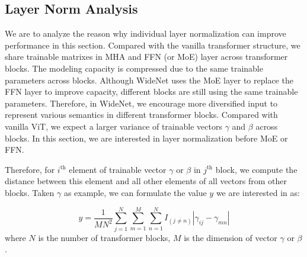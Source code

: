 \documentclass[letterpaper]{article} %
\begin{document}
\subsection{Layer Norm Analysis} 

We are to analyze the reason why individual layer normalization can improve performance in this section. Compared with the vanilla transformer structure, we share trainable matrixes in MHA and FFN (or MoE) layer across transformer blocks. The modeling capacity is compressed due to the same trainable parameters across blocks. Although WideNet uses the MoE layer to replace the FFN layer to improve capacity, different blocks are still using the same trainable parameters. Therefore, in WideNet, we encourage more diversified input to represent various semantics in different transformer blocks. Compared with vanilla ViT, we expect a larger variance of trainable vectors $\gamma$ and $\beta$ across blocks. In this section, we are interested in layer normalization before MoE or FFN.

Therefore, for $i^{\mathrm{th}}$ element of trainable vector $\gamma$ or $\beta$ in $j^{\mathrm{th}}$ block, we compute the distance between this element and all other elements of all vectors from other blocks. Taken $\gamma$ as example, we can formulate the value $y$ we are interested in as:

\begin{equation}
y= \frac{1}{MN^2} \sum_{j=1}^N  \sum_{m=1}^M \sum_{n=1}^N I_{(j\not = n)} | \gamma_{ij} - \gamma_{mn} |
\end{equation}
where $N$ is the number of transformer blocks, $M$ is the dimension of vector $\gamma$ or $\beta$.
\end{document}
